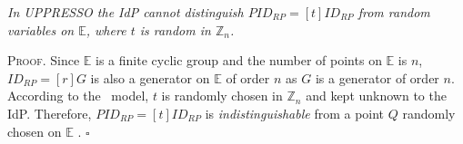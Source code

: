 \vspace{1mm}
 {\em In UPPRESSO the IdP cannot distinguish $PID_{RP} = [t]ID_{RP}$
    from random variables on $\mathbb{E}$, where $t$ is random in $\mathbb{Z}_n$.} %

\vspace{0.75mm}
\noindent \textsc{Proof.}
Since $\mathbb{E}$ is a finite cyclic group     and the number of points on $\mathbb{E}$ is $n$, $ID_{RP} = [r]G$ is also a generator on $\mathbb{E}$ of order $n$ as $G$ is a generator of order $n$.
According to the \dyu~model, $t$ is randomly chosen in $\mathbb{Z}_n$ and kept unknown to the IdP.
Therefore, $PID_{RP} = [t]ID_{RP}$ is \emph{indistinguishable} from a point $Q$ randomly chosen on $\mathbb{E}$ \cite{oprf-proved,strong-oprf}. \hfill $\square$





